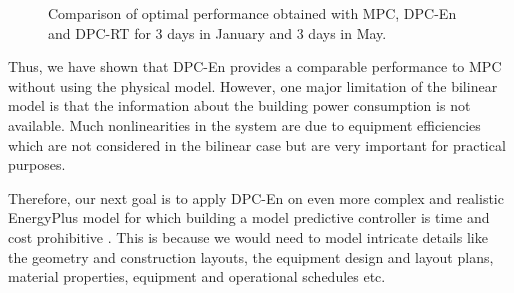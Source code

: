 \begin{figure}[h!]
\begin{center}
	\end{center}
	\caption{Comparison of optimal performance obtained with MPC, DPC-En and DPC-RT for 3 days in January and 3 days in May.}
	\label{F:comparison}
	\captionsetup{justification=centering}
\end{figure}
Thus, we have shown that DPC-En provides a comparable performance to MPC without using the physical model.
However, one major limitation of the bilinear model is that the information about the building power consumption is not available. Much nonlinearities in the system are due to equipment efficiencies which are not considered in the bilinear case but are very important for practical purposes. 

Therefore, our next goal is to apply DPC-En on even more complex and realistic EnergyPlus model for which building a model predictive controller is time and cost prohibitive \cite{Sturzenegger2016}. This is because we would need to model intricate details like the geometry and construction layouts, the equipment design and layout plans, material properties, equipment and operational schedules etc.

